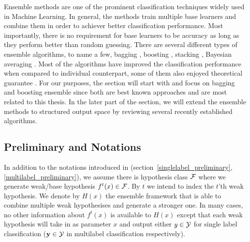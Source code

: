 {Ensemble methods are one of the prominent classification techniques widely used in Machine Learning.
In general, the methods train multiple base learners and combine them in order to achiever better classification performance.
Most importantly, there is no requirement for base learners to be accuracy as long as they perform better than random guessing.
There are several different types of ensemble algorithms, to name a few, bagging \citep{Breiman96bagging}, boosting \citep{Freund97a,Schapire99improved}, stacking \citep{Smyth99linearly}, Bayesian averaging \citep{Freund04generalization}.
Most of the algorithms have improved the classification performance when compared to individual counterpart, some of them also enjoyed theoretical guarantee \citep{Schapire97boosting,Koltchinskii00empirical,Cortes14deep,Cortes14semble}.
For our purposes, the section will start with and focus on bagging and boosting ensemble since both are best known approaches and are most related to this thesis.
In the later part of the section, we will extend the ensemble methods to structured output space by reviewing several recently established algorithms.

%
\subsection{Preliminary and Notations}

In addition to the notations introduced in (section~\ref{singlelabel_preliminary}, \ref{multilabel_preliminary}), we assume there is hypothesis class $\mathcal{F}$ where we generate weak/base hypothesis $f^t(x)\in\mathcal{F}$.
By $t$ we intend to index the $t$'th weak hypothesis.
We denote by $H(x)$ the ensemble framework that is able to combine multiple weak hypothesises and generate a stronger one.
In many cases, no other information about $f^t(x)$ is available to $H(x)$ except that each weak hypothesis will take in as parameter $x$ and output either $y\in\mathcal{Y}$ for single label classification ($\mathbf {y}\in\mathcal{Y}$ in multilabel classification respectively).

%
}

